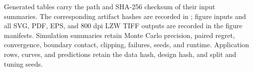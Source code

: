 \documentclass[11pt]{article}
\begin{document}
Generated tables carry the path and SHA-256 checksum of their input summaries. The corresponding artifact hashes are recorded in ; figure inputs and all SVG, PDF, EPS, and 800 dpi LZW TIFF outputs are recorded in the figure manifests. Simulation summaries retain Monte Carlo precision, paired regret, convergence, boundary contact, clipping, failures, seeds, and runtime. Application rows, curves, and predictions retain the data hash, design hash, and split and tuning seeds.
\end{document}
